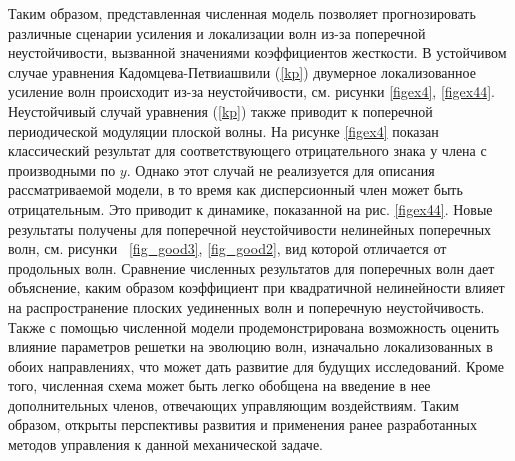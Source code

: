 Таким образом, представленная численная модель позволяет прогнозировать различные сценарии усиления и локализации волн из-за поперечной неустойчивости, вызванной значениями коэффициентов жесткости. В устойчивом случае уравнения Кадомцева-Петвиашвили (\ref {kp}) двумерное локализованное усиление волн происходит из-за неустойчивости, см. рисунки \ref {figex4}, \ref {figex44}. Неустойчивый случай уравнения (\ref {kp}) также приводит к поперечной периодической модуляции плоской волны. На рисунке \ref {figex4} показан классический результат для соответствующего отрицательного знака у члена с производными по $ y $. Однако этот случай не реализуется для описания рассматриваемой модели, в то время как дисперсионный член может быть отрицательным. Это приводит к динамике, показанной на рис. \ref{figex44}. Новые результаты получены для поперечной неустойчивости нелинейных поперечных волн, см. рисунки ~\ref {fig_good3}, \ref{fig_good2}, вид которой отличается от продольных волн. Сравнение численных результатов для поперечных волн дает объяснение, каким образом коэффициент при квадратичной нелинейности влияет на распространение плоских уединенных волн и поперечную неустойчивость. Также с помощью численной модели продемонстрирована возможность оценить влияние параметров решетки на эволюцию волн, изначально локализованных в обоих направлениях, что может дать развитие для будущих исследований. Кроме того, численная схема может быть легко обобщена на введение в нее дополнительных членов, отвечающих управляющим воздействиям. Таким образом, открыты перспективы развития и применения ранее разработанных методов управления к данной механической задаче.
